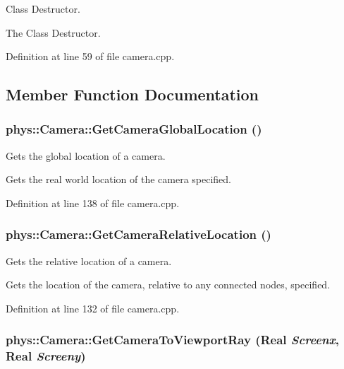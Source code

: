 Class Destructor. 

The Class Destructor. 

Definition at line 59 of file camera.cpp.



\subsection{Member Function Documentation}
\hypertarget{classphys_1_1Camera_a53b61b6c163270ffb4f46eb66a973b10}{
\subsubsection[{GetCameraGlobalLocation}]{ phys::Camera::GetCameraGlobalLocation ()}}
\label{d9/df8/classphys_1_1Camera_a53b61b6c163270ffb4f46eb66a973b10}


Gets the global location of a camera. 

Gets the real world location of the camera specified. 

Definition at line 138 of file camera.cpp.

\hypertarget{classphys_1_1Camera_a771fc7005191c3f83ac1fedb09699943}{
\subsubsection[{GetCameraRelativeLocation}]{ phys::Camera::GetCameraRelativeLocation ()}}
\label{d9/df8/classphys_1_1Camera_a771fc7005191c3f83ac1fedb09699943}


Gets the relative location of a camera. 

Gets the location of the camera, relative to any connected nodes, specified. 

Definition at line 132 of file camera.cpp.

\hypertarget{classphys_1_1Camera_a47c437c8755301512c2757f879e03e73}{
\subsubsection[{GetCameraToViewportRay}]{ phys::Camera::GetCameraToViewportRay ({\bf Real} {\em Screenx}, \/  {\bf Real} {\em Screeny})}}
\label{d9/df8/classphys_1_1Camera_a47c437c8755301512c2757f879e03e73}


